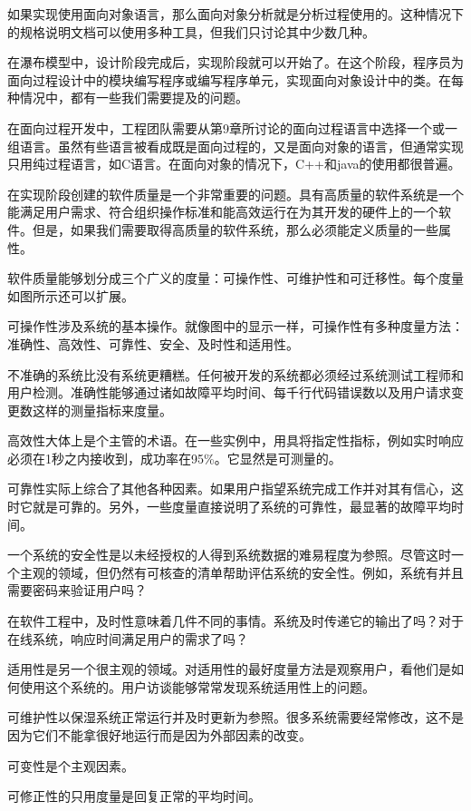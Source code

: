 如果实现使用面向对象语言，那么面向对象分析就是分析过程使用的。这种情况下的规格说明文档可以使用多种工具，但我们只讨论其中少数几种。

在瀑布模型中，设计阶段完成后，实现阶段就可以开始了。在这个阶段，程序员为面向过程设计中的模块编写程序或编写程序单元，实现面向对象设计中的类。在每种情况中，都有一些我们需要提及的问题。

在面向过程开发中，工程团队需要从第9章所讨论的面向过程语言中选择一个或一组语言。虽然有些语言被看成既是面向过程的，又是面向对象的语言，但通常实现只用纯过程语言，如C语言。在面向对象的情况下，C++和java的使用都很普遍。

在实现阶段创建的软件质量是一个非常重要的问题。具有高质量的软件系统是一个能满足用户需求、符合组织操作标准和能高效运行在为其开发的硬件上的一个软件。但是，如果我们需要取得高质量的软件系统，那么必须能定义质量的一些属性。

软件质量能够划分成三个广义的度量：可操作性、可维护性和可迁移性。每个度量如图所示还可以扩展。

可操作性涉及系统的基本操作。就像图中的显示一样，可操作性有多种度量方法：准确性、高效性、可靠性、安全、及时性和适用性。

不准确的系统比没有系统更糟糕。任何被开发的系统都必须经过系统测试工程师和用户检测。准确性能够通过诸如故障平均时间、每千行代码错误数以及用户请求变更数这样的测量指标来度量。

高效性大体上是个主管的术语。在一些实例中，用具将指定性指标，例如实时响应必须在1秒之内接收到，成功率在95\%。它显然是可测量的。

可靠性实际上综合了其他各种因素。如果用户指望系统完成工作并对其有信心，这时它就是可靠的。另外，一些度量直接说明了系统的可靠性，最显著的故障平均时间。

一个系统的安全性是以未经授权的人得到系统数据的难易程度为参照。尽管这时一个主观的领域，但仍然有可核查的清单帮助评估系统的安全性。例如，系统有并且需要密码来验证用户吗？

在软件工程中，及时性意味着几件不同的事情。系统及时传递它的输出了吗？对于在线系统，响应时间满足用户的需求了吗？

适用性是另一个很主观的领域。对适用性的最好度量方法是观察用户，看他们是如何使用这个系统的。用户访谈能够常常发现系统适用性上的问题。

可维护性以保湿系统正常运行并及时更新为参照。很多系统需要经常修改，这不是因为它们不能拿很好地运行而是因为外部因素的改变。

可变性是个主观因素。

可修正性的只用度量是回复正常的平均时间。

